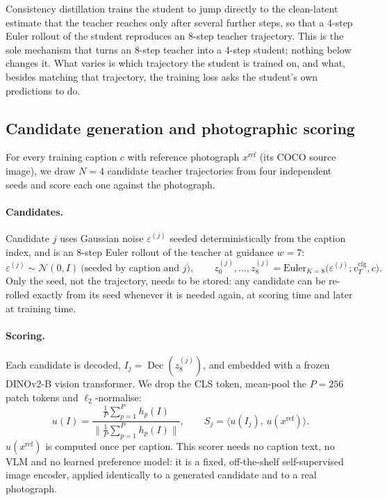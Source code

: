 \documentclass{article} %
\DeclareMathOperator{\Dec}{Dec}
\begin{document}
Consistency distillation trains the student to jump directly to the clean-latent estimate that the
teacher reaches only after several further steps, so that a 4-step Euler rollout of the student
reproduces an 8-step teacher trajectory. This is the sole mechanism that turns an 8-step teacher
into a 4-step student; nothing below changes it. What varies is which trajectory the student is
trained on, and what, besides matching that trajectory, the training loss asks the student's own
predictions to do.

\subsection{Candidate generation and photographic scoring}
\label{sec:selection}
For every training caption $c$ with reference photograph $x^{\mathrm{ref}}$ (its COCO source image),
we draw $N=4$ candidate teacher trajectories from four independent seeds and score each one against
the photograph.

\paragraph{Candidates.} Candidate $j$ uses Gaussian noise $\varepsilon^{(j)}$ seeded deterministically
from the caption index, and is an 8-step Euler rollout of the teacher at guidance $w=7$:
\begin{equation}
\varepsilon^{(j)}\sim\mathcal N(0,I)\ \text{(seeded by caption and $j$)},\qquad
z^{(j)}_0,\dots,z^{(j)}_8=\mathrm{Euler}_{K=8}\big(\varepsilon^{(j)};v_T^{\mathrm{cfg}},c\big).
\end{equation}
Only the seed, not the trajectory, needs to be stored: any candidate can be re-rolled exactly from
its seed whenever it is needed again, at scoring time and later at training time.

\paragraph{Scoring.} Each candidate is decoded, $I_j=\Dec(z^{(j)}_8)$, and embedded with a frozen
DINOv2-B vision transformer. We drop the CLS token, mean-pool the $P{=}256$ patch tokens and
$\ell_2$-normalise:
\begin{equation}
u(I)=\frac{\frac1P\sum_{p=1}^{P}h_p(I)}{\big\lVert\frac1P\sum_{p=1}^{P}h_p(I)\big\rVert},\qquad
S_j=\big\langle u(I_j),\,u(x^{\mathrm{ref}})\big\rangle .
\label{eq:score}
\end{equation}
$u(x^{\mathrm{ref}})$ is computed once per caption. This scorer needs no caption text, no VLM and no
learned preference model: it is a fixed, off-the-shelf self-supervised image encoder, applied
identically to a generated candidate and to a real photograph.
\end{document}
